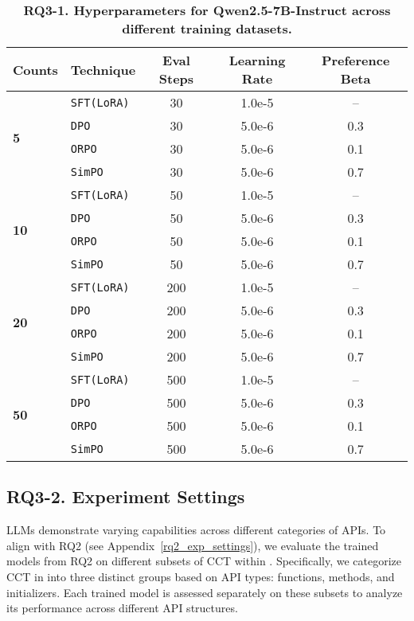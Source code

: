 \begin{table}[h]
\small
\setlength{\tabcolsep}{10pt} 
\caption{\textbf{RQ3-1. Hyperparameters for Qwen2.5-7B-Instruct across different training datasets.}}
\label{rq3.1-hparams}
\vspace{0.5em}
\centering
\begin{tabular}{ll|ccc}
    \toprule
    \textbf{Counts} & \textbf{Technique} & \textbf{Eval Steps} & \textbf{Learning Rate} & \textbf{Preference Beta} \\
    \midrule
    \multirow{4}{*}{\textbf{5}} &
      \texttt{SFT(LoRA)}  & 30  & 1.0e-5    & --  \\
    & \texttt{DPO}        & 30  & 5.0e-6    & 0.3 \\
    & \texttt{ORPO}       & 30  & 5.0e-6    & 0.1 \\
    & \texttt{SimPO}      & 30  & 5.0e-6    & 0.7 \\
    \hline
    \multirow{4}{*}{\textbf{10}} &
      \texttt{SFT(LoRA)}  & 50  & 1.0e-5    & --  \\
    & \texttt{DPO}        & 50  & 5.0e-6    & 0.3 \\
    & \texttt{ORPO}       & 50  & 5.0e-6    & 0.1 \\
    & \texttt{SimPO}      & 50  & 5.0e-6    & 0.7 \\
    \hline
    \multirow{4}{*}{\textbf{20}} &
      \texttt{SFT(LoRA)}  & 200  & 1.0e-5    & --  \\
    & \texttt{DPO}        & 200  & 5.0e-6    & 0.3 \\
    & \texttt{ORPO}       & 200  & 5.0e-6    & 0.1 \\
    & \texttt{SimPO}      & 200  & 5.0e-6    & 0.7 \\
    \hline
    \multirow{4}{*}{\textbf{50}} &
      \texttt{SFT(LoRA)}  & 500  & 1.0e-5    & --  \\
    & \texttt{DPO}        & 500  & 5.0e-6    & 0.3 \\
    & \texttt{ORPO}       & 500  & 5.0e-6    & 0.1 \\
    & \texttt{SimPO}      & 500  & 5.0e-6    & 0.7 \\
    \bottomrule
\end{tabular}
\label{tab:methods_params}
\vspace{-0.5em}
\end{table}

\subsection{RQ3-2. Experiment Settings}
\label{rq3.2_exp_settings}
LLMs demonstrate varying capabilities across different categories of APIs. To align with RQ2 (see Appendix~\ref{rq2_exp_settings}), we evaluate the trained models from RQ2 on different subsets of CCT within \benchmark. Specifically, we categorize CCT in \benchmark into three distinct groups based on API types: functions, methods, and initializers. Each trained model is assessed separately on these subsets to analyze its performance across different API structures.

